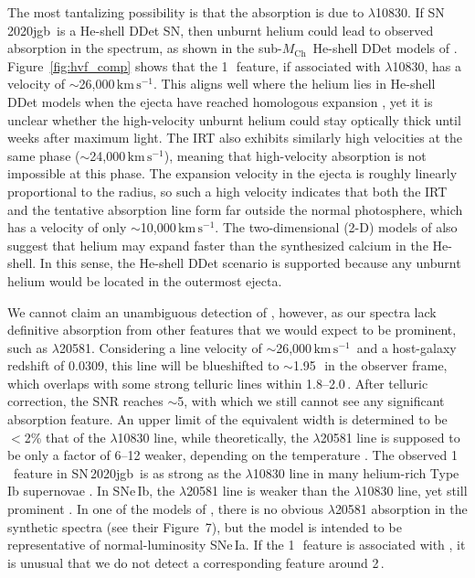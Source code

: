 \documentclass[twocolumn]{aastex631}
\newcommand{\sn}{SN\,2020jgb}
\newcommand{\Mch}{$M_\mathrm{Ch}$}
\newcommand{\kms}{$\mathrm{km}\,\mathrm{s}^{-1}$}
\begin{document}
The most tantalizing possibility is that the absorption is due to  $\lambda$10830. If \sn\ is a He-shell DDet SN, then unburnt helium could lead to observed absorption in the spectrum, as shown in the sub-\Mch\ He-shell DDet models of \citet{Boyle2017_Helium}. Figure~\ref{fig:hvf_comp} shows that the 1\,\micron\ feature, if associated with  $\lambda$10830, has a velocity of $\sim$26,000\,\kms. This aligns well where the helium lies in He-shell DDet models when the ejecta have reached homologous expansion \citep{Kromer_DD_2010, polin_observational_2019}, yet it is unclear whether the high-velocity unburnt helium could stay optically thick until weeks after maximum light. The  IRT also exhibits similarly high velocities at the same phase ($\sim$24,000\,\kms), meaning that high-velocity absorption is not impossible at this phase. The expansion velocity in the ejecta is roughly linearly proportional to the radius, so such a high velocity indicates that both the  IRT and the tentative  absorption line form far outside the normal photosphere, which has a velocity of only $\sim$10,000\,\kms. The two-dimensional (2-D) models of \citet{Kromer_DD_2010} also suggest that helium may expand faster than the synthesized calcium in the He-shell. In this sense, the He-shell DDet scenario is supported because any unburnt helium would be located in the outermost ejecta.

We cannot claim an unambiguous detection of , however, as our spectra lack definitive absorption from other  features that we would expect to be prominent, such as  $\lambda$20581. Considering a line velocity of $\sim$26,000\,\kms\ and a host-galaxy redshift of 0.0309, this line will be blueshifted to $\sim$1.95\,\micron\ in the observer frame, which overlaps with some strong telluric lines within 1.8--2.0\,\micron. After telluric correction, the SNR reaches $\sim$5, with which we still cannot see any significant absorption feature. An upper limit of the equivalent width is determined to be $<$2\% that of the  $\lambda$10830 line, while theoretically, the $\lambda$20581 line is supposed to be only a factor of 6--12 weaker, depending on the temperature \citep{Marion2009_NIR}. The observed 1\,\micron\ feature in \sn\ is as strong as the  $\lambda$10830 line in many helium-rich Type Ib supernovae \citep[SNe\,Ib; see][for a review of SN spectral classification]{Filippenko97, Gal-Yam_2017}. In SNe\,Ib, the  $\lambda$20581 line is weaker than the  $\lambda$10830 line, yet still prominent \citep{CSP_Ibc_2022}. In one of the models of \citet{Boyle2017_Helium}, there is no obvious  $\lambda$20581 absorption in the synthetic spectra (see their Figure~7), but the model is intended to be representative of normal-luminosity SNe\,Ia. If the 1\,\micron\ feature is associated with , it is unusual that we do not detect a corresponding feature around 2\,\micron.
\end{document}
